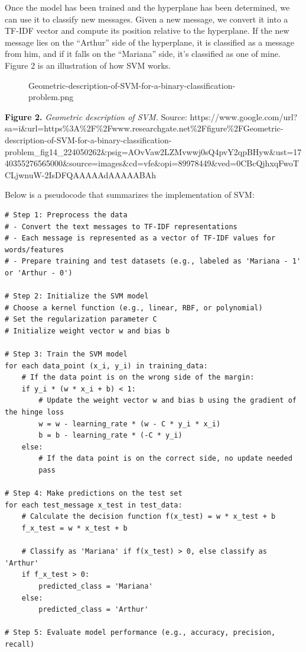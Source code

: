 \documentclass[11pt]{article}
\begin{document}
Once the model has been trained and the hyperplane has been determined,
we can use it to classify new messages. Given a new message, we convert
it into a TF-IDF vector and compute its position relative to the
hyperplane. If the new message lies on the ``Arthur'' side of the
hyperplane, it is classified as a message from him, and if it falls on
the ``Mariana'' side, it's classified as one of mine. Figure 2 is an
illustration of how SVM works.

\begin{figure}
\centering
\caption{Geometric-description-of-SVM-for-a-binary-classification-problem.png}
\end{figure}

\textbf{Figure 2.} \emph{Geometric description of SVM.} Source:
https://www.google.com/url?sa=i\&url=https\%3A\%2F\%2Fwww.researchgate.net\%2Ffigure\%2FGeometric-description-of-SVM-for-a-binary-classification-problem\_fig14\_224050262\&psig=AOvVaw2LZMvwwj0sQ4pvY2qpBHyw\&ust=1740355276565000\&source=images\&cd=vfe\&opi=89978449\&ved=0CBcQjhxqFwoTCLjwnuW-2IsDFQAAAAAdAAAAABAh

Below is a pseudocode that summarizes the implementation of SVM:

\begin{verbatim}
# Step 1: Preprocess the data
# - Convert the text messages to TF-IDF representations
# - Each message is represented as a vector of TF-IDF values for words/features
# - Prepare training and test datasets (e.g., labeled as 'Mariana - 1' or 'Arthur - 0')

# Step 2: Initialize the SVM model
# Choose a kernel function (e.g., linear, RBF, or polynomial)
# Set the regularization parameter C
# Initialize weight vector w and bias b

# Step 3: Train the SVM model
for each data_point (x_i, y_i) in training_data:
    # If the data point is on the wrong side of the margin:
    if y_i * (w * x_i + b) < 1:
        # Update the weight vector w and bias b using the gradient of the hinge loss
        w = w - learning_rate * (w - C * y_i * x_i)
        b = b - learning_rate * (-C * y_i)
    else:
        # If the data point is on the correct side, no update needed
        pass

# Step 4: Make predictions on the test set
for each test_message x_test in test_data:
    # Calculate the decision function f(x_test) = w * x_test + b
    f_x_test = w * x_test + b

    # Classify as 'Mariana' if f(x_test) > 0, else classify as 'Arthur'
    if f_x_test > 0:
        predicted_class = 'Mariana'
    else:
        predicted_class = 'Arthur'

# Step 5: Evaluate model performance (e.g., accuracy, precision, recall)
\end{verbatim}
\end{document}
